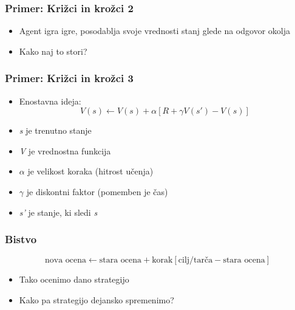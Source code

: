\documentclass{beamer}    %
\begin{document}
\begin{frame}
    \frametitle{Primer: Križci in krožci 2}
    \begin{itemize}
        \item Agent igra igre, posodablja svoje vrednosti stanj glede na odgovor okolja
        \item Kako naj to stori?
    \end{itemize}
\end{frame}


\begin{frame}
    \frametitle{Primer: Križci in krožci 3}
    \begin{itemize}
        \item Enostavna ideja:                                  \pause
        $$
        V(s) \leftarrow V(s) + \alpha [R + \gamma V(s') - V(s)]
        $$
                                                                \pause
        \item \textit{s} je trenutno stanje                     \pause
        \item \textit{V} je vrednostna funkcija                 \pause
        \item $\alpha$ je velikost koraka (hitrost učenja)      \pause
        \item $\gamma$ je diskontni faktor (pomemben je čas)    \pause
        \item \textit{s'} je stanje, ki sledi \textit{s}        
    \end{itemize}
\end{frame}


\begin{frame}
    \frametitle{Bistvo}
    $$
    \text{nova ocena} \leftarrow \text{stara ocena} + \text{korak} 
    [\text{cilj/tarča} - \text{stara ocena}]
    $$
    \medskip
    \begin{itemize}
        \item Tako ocenimo dano strategijo
        \item Kako pa strategijo dejansko spremenimo?
    \end{itemize}
\end{frame}
\end{document}
